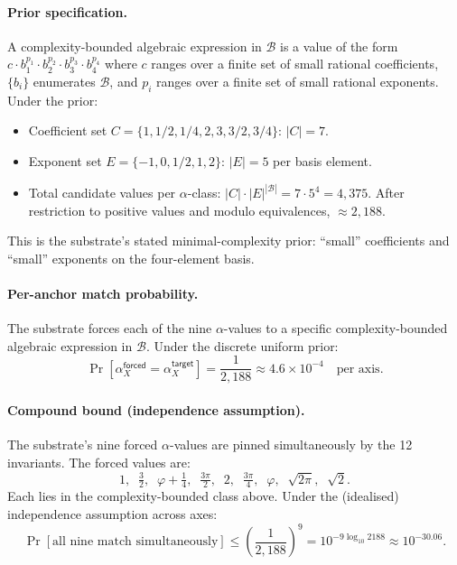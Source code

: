\documentclass[11pt,a4paper]{amsart}
\theoremstyle{plain}
\theoremstyle{definition}
\begin{document}
\paragraph{Prior specification.} A complexity-bounded algebraic expression in $\mathcal{B}$ is a value of the form $c \cdot b_1^{p_1} \cdot b_2^{p_2} \cdot b_3^{p_3} \cdot b_4^{p_4}$ where $c$ ranges over a finite set of small rational coefficients, $\{b_i\}$ enumerates $\mathcal{B}$, and $p_i$ ranges over a finite set of small rational exponents. Under the prior:
\begin{itemize}[itemsep=2pt,leftmargin=2em]
\item Coefficient set $C = \{1, 1/2, 1/4, 2, 3, 3/2, 3/4\}$: $|C| = 7$.
\item Exponent set $E = \{-1, 0, 1/2, 1, 2\}$: $|E| = 5$ per basis element.
\item Total candidate values per $\alpha$-class: $|C| \cdot |E|^{|\mathcal{B}|} = 7 \cdot 5^4 = 4{,}375$. After restriction to positive values and modulo equivalences, $\approx 2{,}188$.
\end{itemize}
This is the substrate's stated minimal-complexity prior: ``small'' coefficients and ``small'' exponents on the four-element basis.

\paragraph{Per-anchor match probability.} The substrate forces each of the nine $\alpha$-values to a specific complexity-bounded algebraic expression in $\mathcal{B}$. Under the discrete uniform prior:
\[
\Pr[\alpha_X^{\textsf{forced}} = \alpha_X^{\textsf{target}}] = \frac{1}{2{,}188} \approx 4.6 \times 10^{-4} \quad \text{per axis}.
\]

\paragraph{Compound bound (independence assumption).} The substrate's nine forced $\alpha$-values are pinned simultaneously by the 12 invariants. The forced values are:
\[
1,\;\; \tfrac{3}{2},\;\; \varphi + \tfrac{1}{4},\;\; \tfrac{3\pi}{2},\;\; 2,\;\; \tfrac{3\pi}{4},\;\; \varphi,\;\; \sqrt{2\pi},\;\; \sqrt{2}.
\]
Each lies in the complexity-bounded class above. Under the (idealised) independence assumption across axes:
\[
\Pr[\text{all nine match simultaneously}] \le \left(\frac{1}{2{,}188}\right)^9 = 10^{-9 \log_{10} 2188} \approx 10^{-30.06}.
\]
\end{document}
